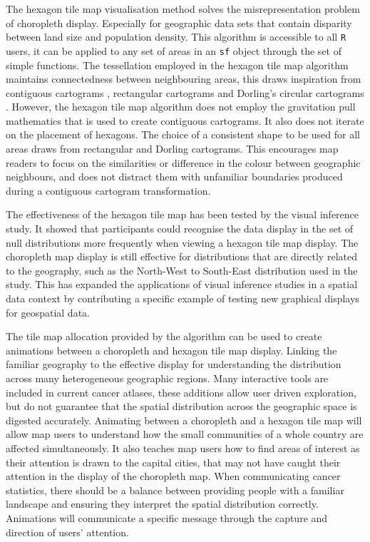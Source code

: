 \documentclass{monashthesis}
\begin{document}
The hexagon tile map visualisation method solves the misrepresentation problem of choropleth display. Especially for geographic data sets that contain disparity between land size and population density. This algorithm is accessible to all \texttt{R} users, it can be applied to any set of areas in an \texttt{sf} \autocite{sf} object through the set of simple functions.
The tessellation employed in the hexagon tile map algorithm maintains connectedness between neighbouring areas, this draws inspiration from contiguous cartograms \autocite{ACA}, rectangular cartograms \autocite{RSCW} and Dorling's circular cartograms \autocite{ACTUC}. However, the hexagon tile map algorithm does not employ the gravitation pull mathematics that is used to create contiguous cartograms. It also does not iterate on the placement of hexagons. The choice of a consistent shape to be used for all areas draws from rectangular and Dorling cartograms. This encourages map readers to focus on the similarities or difference in the colour between geographic neighbours, and does not distract them with unfamiliar boundaries produced during a contiguous cartogram transformation.

The effectiveness of the hexagon tile map has been tested by the visual inference study. It showed that participants could recognise the data display in the set of null distributions more frequently when viewing a hexagon tile map display. The choropleth map display is still effective for distributions that are directly related to the geography, such as the North-West to South-East distribution used in the study. This has expanded the applications of visual inference studies in a spatial data context by contributing a specific example of testing new graphical displays for geospatial data.

The tile map allocation provided by the algorithm can be used to create animations between a choropleth and hexagon tile map display. Linking the familiar geography to the effective display for understanding the distribution across many heterogeneous geographic regions. Many interactive tools are included in current cancer atlases, these additions allow user driven exploration, but do not guarantee that the spatial distribution across the geographic space is digested accurately.
Animating between a choropleth and a hexagon tile map will allow map users to understand how the small communities of a whole country are affected simultaneously. It also teaches map users how to find areas of interest as their attention is drawn to the capital cities, that may not have caught their attention in the display of the choropleth map. When communicating cancer statistics, there should be a balance between providing people with a familiar landscape and ensuring they interpret the spatial distribution correctly. Animations will communicate a specific message through the capture and direction of users' attention.
\end{document}
